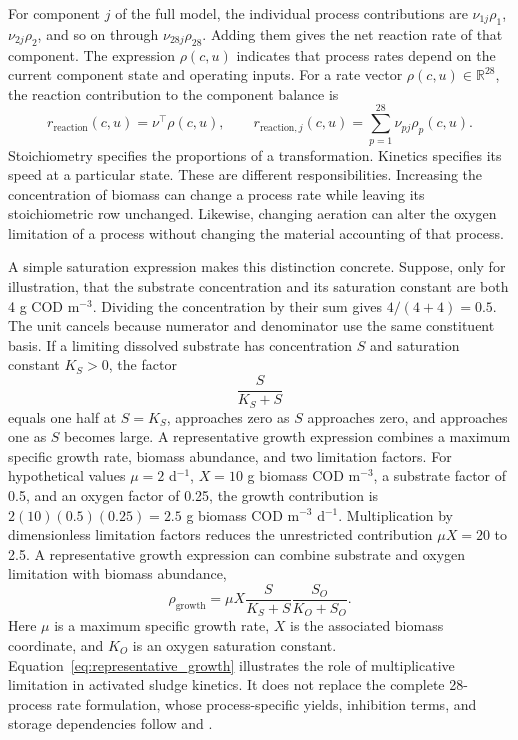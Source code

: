 For component $j$ of the full model, the individual process contributions are $\nu_{1j}\rho_1$, $\nu_{2j}\rho_2$, and so on through $\nu_{28j}\rho_{28}$. Adding them gives the net reaction rate of that component. The expression $\rho(c,u)$ indicates that process rates depend on the current component state and operating inputs. For a rate vector $\rho(c,u)\in\mathbb{R}^{28}$, the reaction contribution to the component balance is
\begin{equation}
r_{\mathrm{reaction}}(c,u)=\nu^\top\rho(c,u),\qquad
r_{\mathrm{reaction},j}(c,u)=\sum_{p=1}^{28}\nu_{pj}\rho_p(c,u).
\label{eq:reaction_contribution}
\end{equation}
Stoichiometry specifies the proportions of a transformation. Kinetics specifies its speed at a particular state. These are different responsibilities. Increasing the concentration of biomass can change a process rate while leaving its stoichiometric row unchanged. Likewise, changing aeration can alter the oxygen limitation of a process without changing the material accounting of that process.

A simple saturation expression makes this distinction concrete. Suppose, only for illustration, that the substrate concentration and its saturation constant are both 4 g COD m$^{-3}$. Dividing the concentration by their sum gives $4/(4+4)=0.5$. The unit cancels because numerator and denominator use the same constituent basis. If a limiting dissolved substrate has concentration $S$ and saturation constant $K_S>0$, the factor
\begin{equation}
\frac{S}{K_S+S}
\label{eq:saturation_example}
\end{equation}
equals one half at $S=K_S$, approaches zero as $S$ approaches zero, and approaches one as $S$ becomes large. A representative growth expression combines a maximum specific growth rate, biomass abundance, and two limitation factors. For hypothetical values $\mu=2$ d$^{-1}$, $X=10$ g biomass COD m$^{-3}$, a substrate factor of 0.5, and an oxygen factor of 0.25, the growth contribution is $2(10)(0.5)(0.25)=2.5$ g biomass COD m$^{-3}$ d$^{-1}$. Multiplication by dimensionless limitation factors reduces the unrestricted contribution $\mu X=20$ to 2.5. A representative growth expression can combine substrate and oxygen limitation with biomass abundance,
\begin{equation}
\rho_{\mathrm{growth}}=
\mu X\frac{S}{K_S+S}\frac{S_O}{K_O+S_O}.
\label{eq:representative_growth}
\end{equation}
Here $\mu$ is a maximum specific growth rate, $X$ is the associated biomass coordinate, and $K_O$ is an oxygen saturation constant. Equation~\eqref{eq:representative_growth} illustrates the role of multiplicative limitation in activated sludge kinetics. It does not replace the complete 28-process rate formulation, whose process-specific yields, inhibition terms, and storage dependencies follow \citet{Henze2006} and \citet{Guerrero2011}.

